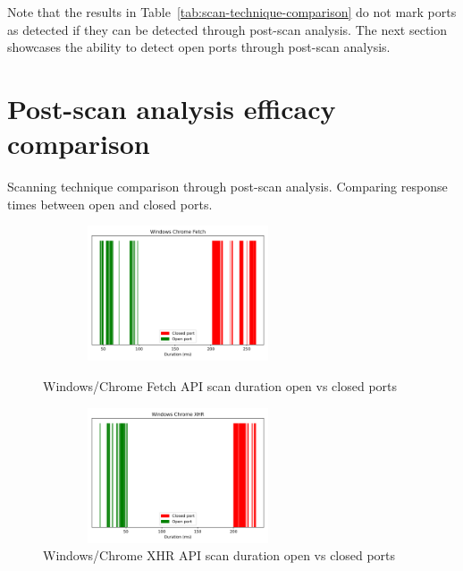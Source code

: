 \clearpage

Note that the results in Table~\ref{tab:scan-technique-comparison} do not mark ports as detected if they can be detected through post-scan analysis. The next section showcases the ability to detect open ports through post-scan analysis.


\section{Post-scan analysis efficacy comparison}
\label{appendix:scan-duration-comparison}
Scanning technique comparison through post-scan analysis. Comparing response times between open and closed ports.

\begin{figure}[ht]
\centering
\begin{minipage}{.45\textwidth}
  \centering
\includegraphics[width=8cm, height=4cm, keepaspectratio]{port_scanning_techniques/img/windows_chrome_efficacy_fetch.png}
    \caption{Windows/Chrome Fetch API scan duration open vs closed ports}
    \label{fig:win-chrome-fetch}
\end{minipage}
\hspace{0.5cm} %
\begin{minipage}{.45\textwidth}
\includegraphics[width=8cm, height=4cm, keepaspectratio]{port_scanning_techniques/img/windows_chrome_efficacy_xhr.png}
    \caption{Windows/Chrome XHR API scan duration open vs closed ports}
    \label{fig:appendix-win-chrome-xhr}
\end{minipage}
\end{figure}

